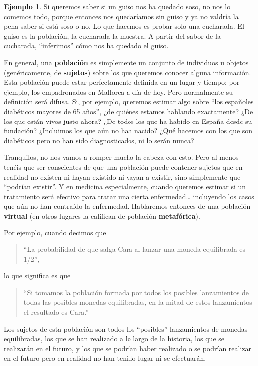 \documentclass[
]{book}
\theoremstyle{definition}
\theoremstyle{definition}
\newtheorem{example}{Ejemplo}[chapter]
\theoremstyle{definition}
\theoremstyle{definition}
\theoremstyle{remark}
\begin{document}
\begin{example}
\protect\hypertarget{exm:caldo}{}\label{exm:caldo}Si queremos saber si un guiso nos ha quedado soso, no nos lo comemos todo, porque entonces nos quedaríamos sin guiso y ya no valdría la pena saber si está soso o no. Lo que hacemos es probar solo una cucharada. El guiso es la población, la cucharada la muestra. A partir del sabor de la cucharada, ``inferimos'' cómo nos ha quedado el guiso.
\end{example}

En general, una \textbf{población} es simplemente un conjunto de individuos u objetos (genéricamente, de \textbf{sujetos}) sobre los que queremos conocer alguna información. Esta población puede estar perfectamente definida en un lugar y tiempo: por ejemplo, los empadronados en Mallorca a día de hoy. Pero normalmente su definición será difusa. Si, por ejemplo, queremos estimar algo sobre ``los españoles diabéticos mayores de 65 años'', ¿de quiénes estamos hablando exactamente? ¿De los que están vivos justo ahora? ¿De todos los que ha habido en España desde su fundación? ¿Incluimos los que aún no han nacido? ¿Qué hacemos con los que son diabéticos pero no han sido diagnosticados, ni lo serán nunca?

Tranquilos, no nos vamos a romper mucho la cabeza con esto. Pero al menos tenéis que ser conscientes de que una población puede contener sujetos que en realidad no existen ni hayan existido ni vayan a existir, sino simplemente que ``podrían existir''. Y en medicina especialmente, cuando queremos estimar si un tratamiento será efectivo para tratar una cierta enfermedad\ldots{} incluyendo los casos que aún no han contraído la enfermedad. Hablaremos entonces de una población \textbf{virtual} (en otros lugares la califican de población \textbf{metafórica}).

Por ejemplo, cuando decimos que

\begin{quote}
``La probabilidad de que salga Cara al lanzar una moneda equilibrada es 1/2'',
\end{quote}

lo que significa es que

\begin{quote}
``Si tomamos la población formada por todos los posibles lanzamientos de todas las posibles monedas equilibradas, en la mitad de estos lanzamientos el resultado es Cara.''
\end{quote}

Los sujetos de esta población son todos los ``posibles'' lanzamientos de monedas equilibradas, los que se han realizado a lo largo de la historia, los que se realizarán en el futuro, y los que se podrían haber realizado o se podrían realizar en el futuro pero en realidad no han tenido lugar ni se efectuarán.
\end{document}
